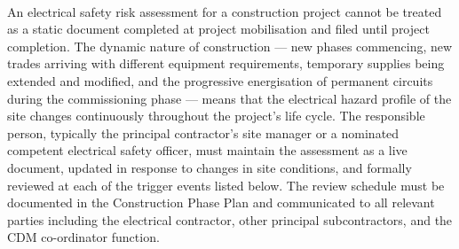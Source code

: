 \paragraph{}
An electrical safety risk assessment for a construction project cannot be treated as a static document completed at project mobilisation and filed until project completion. The dynamic nature of construction --- new phases commencing, new trades arriving with different equipment requirements, temporary supplies being extended and modified, and the progressive energisation of permanent circuits during the commissioning phase --- means that the electrical hazard profile of the site changes continuously throughout the project's life cycle. The responsible person, typically the principal contractor's site manager or a nominated competent electrical safety officer, must maintain the assessment as a live document, updated in response to changes in site conditions, and formally reviewed at each of the trigger events listed below. The review schedule must be documented in the Construction Phase Plan and communicated to all relevant parties including the electrical contractor, other principal subcontractors, and the CDM co-ordinator function.

